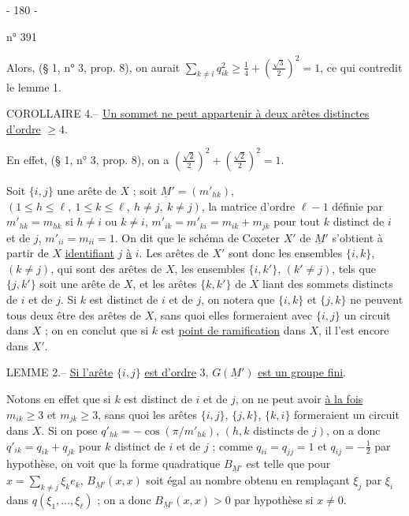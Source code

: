 \begin{center}- 180 -\end{center}
\hfill n° 391

Alors, (§ 1, n° 3, prop. 8), on aurait $\sum_{k\ne i}q_{ik}^2\geq\frac14+(\frac{\sqrt3}{2})^2=1$, ce qui contredit le lemme 1.

COROLLAIRE 4.-- \uline{Un sommet ne peut appartenir à deux arêtes distinctes d'ordre} $\geq4$.

En effet, (§ 1, n° 3, prop. 8), on a $(\frac{\sqrt2}{2})^2+(\frac{\sqrt2}{2})^2=1$.

Soit $\{i,j\}$ une arête de $X$ ; soit $\underline{M}'=(m'_{hk})$, $(1\leq h\leq\ell,\ 1\leq k\leq\ell,\ h\ne j,\ k\ne j)$, la matrice d'ordre $\ell-1$ définie par $m'_{hk}=m_{hk}$ si $h\ne i$ ou $k\ne i$, $m'_{ik}=m'_{ki}=m_{ik}+m_{jk}$ pour tout $k$ distinct de $i$ et de $j$, $m'_{ii}=m_{ii}=1$. On dit que le schéma de Coxeter $X'$ de $\underline M'$ s'obtient à partir de $X$ \uline{identifiant} $j$ \uline{à} $i$. Les arêtes de $X'$ sont donc les ensembles $\{i,k\}$, $(k\ne j)$, qui sont des arêtes de $X$, les ensembles $\{i,k'\}$, $(k'\ne j)$, tels que $\{j,k'\}$ soit une arête de $X$, et les arêtes $\{k,k'\}$ de $X$ liant des sommets distincts de $i$ et de $j$. Si $k$ est distinct de $i$ et de $j$, on notera que $\{i,k\}$ et $\{j,k\}$ ne peuvent tous deux être des arêtes de $X$, sans quoi elles formeraient avec $\{i,j\}$ un circuit dans $X$ ; on en conclut que si $k$ est \uline{point de ramification} dans $X$, il l'est encore dans $X'$.

LEMME 2.-- \uline{Si l'arête} $\{i,j\}$ \uline{est d'ordre} 3, $G(\underline M')$ \uline{est un groupe fini}.

Notons en effet que si $k$ est distinct de $i$ et de $j$, on ne peut avoir \uline{à la fois} $m_{ik}\geq3$ et $m_{jk}\geq3$, sans quoi les arêtes $\{i,j\}$, $\{j,k\}$, $\{k,i\}$ formeraient un circuit dans $X$. Si on pose $q'_{hk}=-\cos(\pi/m'_{hk})$, $(h,k\text{ distincts de }j)$, on a donc $q'_{ik}=q_{ik}+q_{jk}$ pour $k$ distinct de $i$ et de $j$ ; comme $q_{ii}=q_{jj}=1$ et $q_{ij}=-\frac12$ par hypothèse, on voit que la forme quadratique $B_{\underline M'}$ est telle que pour $x=\sum_{k\ne j}\xi_k e_k$, $B_{\underline M'}(x,x)$ soit égal au nombre obtenu en remplaçant $\xi_j$ par $\xi_i$ dans $q(\xi_1,\ldots,\xi_\ell)$ ; on a donc $B_{\underline M'}(x,x)>0$ par hypothèse si $x\ne0$.
